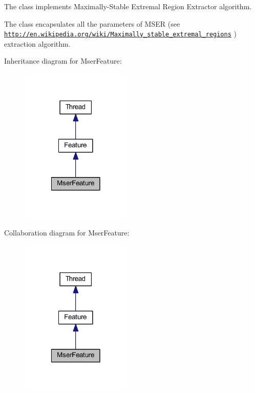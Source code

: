 \begin{DoxyVerb}The class implements Maximally-Stable Extremal Region Extractor algorithm.
\end{DoxyVerb}
 The class encapsulates all the parameters of M\-S\-E\-R (see \href{http://en.wikipedia.org/wiki/Maximally_stable_extremal_regions}{\tt http\-://en.\-wikipedia.\-org/wiki/\-Maximally\-\_\-stable\-\_\-extremal\-\_\-regions} ) extraction algorithm. 

Inheritance diagram for Mser\-Feature\-:
\nopagebreak
\begin{figure}[H]
\begin{center}
\leavevmode
\includegraphics[width=150pt]{class_mser_feature__inherit__graph}
\end{center}
\end{figure}


Collaboration diagram for Mser\-Feature\-:
\nopagebreak
\begin{figure}[H]
\begin{center}
\leavevmode
\includegraphics[width=150pt]{class_mser_feature__coll__graph}
\end{center}
\end{figure}

